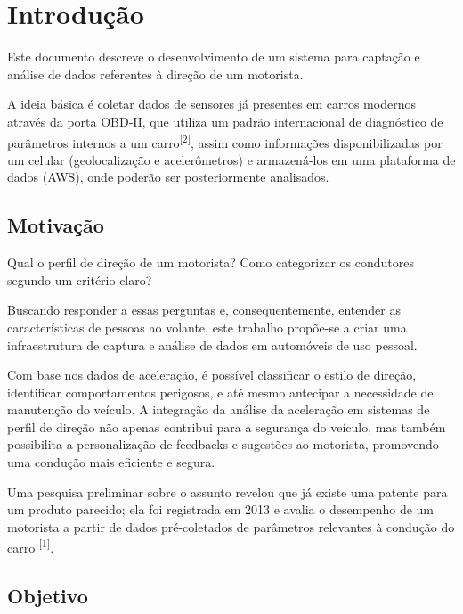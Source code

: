 \chapter{Introdução}\label{CAP:introducao}

Este documento descreve o desenvolvimento de um sistema para captação e análise de dados referentes à direção de um motorista.

A ideia básica é coletar dados de sensores já presentes em carros modernos através da porta OBD-II, que utiliza um padrão internacional de diagnóstico de parâmetros internos a um carro\textsuperscript{[2]}, assim como informações disponibilizadas por um celular (geolocalização e acelerômetros) e armazená-los em uma plataforma de dados (AWS), onde poderão ser posteriormente analisados.

\section{Motivação}

Qual o perfil de direção de um motorista? Como categorizar os condutores segundo um critério claro?

Buscando responder a essas perguntas e, consequentemente, entender as características de pessoas ao volante, este trabalho propõe-se a criar uma infraestrutura de captura e análise de dados em automóveis de uso pessoal.

Com base nos dados de aceleração, é possível classificar o estilo de direção, identificar comportamentos perigosos, e até mesmo antecipar a necessidade de manutenção do veículo. A integração da análise da aceleração em sistemas de perfil de direção não apenas contribui para a segurança do veículo, mas também possibilita a personalização de feedbacks e sugestões ao motorista, promovendo uma condução mais eficiente e segura.

	
Uma pesquisa preliminar sobre o assunto revelou que já existe uma patente para um produto parecido; ela foi registrada em 2013 e avalia o desempenho de um motorista a partir de dados pré-coletados de parâmetros relevantes à condução do carro \textsuperscript{[1]}.

\section{Objetivo}

